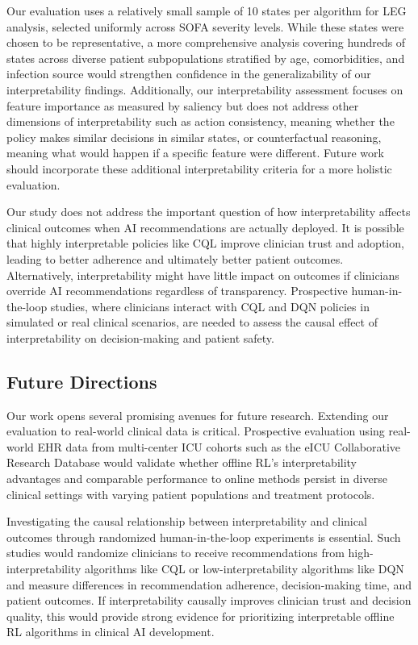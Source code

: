 Our evaluation uses a relatively small sample of 10 states per algorithm for LEG analysis, selected uniformly across SOFA severity levels. While these states were chosen to be representative, a more comprehensive analysis covering hundreds of states across diverse patient subpopulations stratified by age, comorbidities, and infection source would strengthen confidence in the generalizability of our interpretability findings. Additionally, our interpretability assessment focuses on feature importance as measured by saliency but does not address other dimensions of interpretability such as action consistency, meaning whether the policy makes similar decisions in similar states, or counterfactual reasoning, meaning what would happen if a specific feature were different. Future work should incorporate these additional interpretability criteria for a more holistic evaluation.

Our study does not address the important question of how interpretability affects clinical outcomes when AI recommendations are actually deployed. It is possible that highly interpretable policies like CQL improve clinician trust and adoption, leading to better adherence and ultimately better patient outcomes. Alternatively, interpretability might have little impact on outcomes if clinicians override AI recommendations regardless of transparency. Prospective human-in-the-loop studies, where clinicians interact with CQL and DQN policies in simulated or real clinical scenarios, are needed to assess the causal effect of interpretability on decision-making and patient safety.


\subsection{Future Directions}\label{sec:discussion:future}

Our work opens several promising avenues for future research. Extending our evaluation to real-world clinical data is critical. Prospective evaluation using real-world EHR data from multi-center ICU cohorts such as the eICU Collaborative Research Database \citep{pollard2018eicu} would validate whether offline RL's interpretability advantages and comparable performance to online methods persist in diverse clinical settings with varying patient populations and treatment protocols.

Investigating the causal relationship between interpretability and clinical outcomes through randomized human-in-the-loop experiments is essential. Such studies would randomize clinicians to receive recommendations from high-interpretability algorithms like CQL or low-interpretability algorithms like DQN and measure differences in recommendation adherence, decision-making time, and patient outcomes. If interpretability causally improves clinician trust and decision quality, this would provide strong evidence for prioritizing interpretable offline RL algorithms in clinical AI development.

